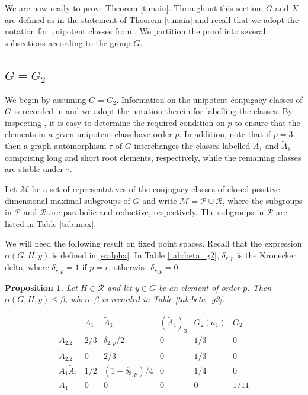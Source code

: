 \documentclass[twoside,a4paper,reqno,11pt]{amsart}
\renewcommand{\a}{\alpha}
\renewcommand{\b}{\beta}
\newcommand{\<}{\langle}
\renewcommand{\>}{\rangle}
\newcommand{\leqs}{\leqslant}
\renewcommand{\:}{\colon}
\theoremstyle{plain}
\newtheorem{prop}[thm]{Proposition}
\theoremstyle{definition}
\begin{document}
We are now ready to prove Theorem \ref{t:main}. Throughout this section, $G$ and $X$ are defined as in the statement of Theorem \ref{t:main} and recall that we adopt the notation for unipotent classes from \cite{LS_book}. We partition the proof into several subsections according to the group $G$.

\subsection{$G = G_2$}\label{ss:g2}

We begin by assuming $G = G_2$. Information on the unipotent conjugacy classes of $G$ is recorded in \cite[Table 22.1.5]{LS_book} and we adopt the notation therein for labelling the classes. By inspecting \cite[Table 1]{Law1}, it is easy to determine the required condition on $p$ to ensure that the elements in a given unipotent class have order $p$. In addition, note that if $p=3$ then a graph automorphism $\tau$ of $G$ interchanges the classes labelled $A_1$ and $\tilde{A}_1$ comprising long and short root elements, respectively, while the remaining classes are stable under $\tau$. 

Let $\mathcal{M}$ be a set of representatives of the conjugacy classes of closed positive dimensional maximal subgroups of $G$ and write $\mathcal{M} = \mathcal{P} \cup \mathcal{R}$, where the subgroups in $\mathcal{P}$ and $\mathcal{R}$ are parabolic and reductive, respectively. The subgroups in $\mathcal{R}$ are listed in Table \ref{tab:max}.

We will need the following result on fixed point spaces. Recall that the expression $\a(G,H,y)$ is defined in \eqref{e:alpha}. In Table \ref{tab:beta_g2}, $\delta_{r,p}$ is the Kronecker delta, where $\delta_{r,p}=1$ if $p=r$, otherwise $\delta_{r,p}=0$.

\begin{prop}\label{p:g2_dim3}
Let $H \in \mathcal{R}$ and let $y \in G$ be an element of order $p$. Then $\a(G,H,y) \leqs \b$, where $\b$ is recorded in Table \ref{tab:beta_g2}.
\end{prop}

{\small
\begin{table}
\[
\begin{array}{l|ccccc}
& A_1 & \tilde{A}_1 & (\tilde{A}_1)_3 & G_2(a_1) & G_2 \\ \hline
A_2.2 & 2/3 & \delta_{2,p}/2 & 0 & 1/3  & 0 \\
\tilde{A}_2.2  & 0 & 2/3 & 0 & 1/3 & 0 \\
A_1\tilde{A}_1 & 1/2 & (1+\delta_{3,p})/4 & 0 & 1/4 & 0 \\
A_1 & 0 & 0 & 0 & 0 & 1/11 \\
\end{array}
\]
\caption{The upper bound $\a(G,H,y) \leqs \b$ in Proposition \ref{p:g2_dim3}}
\label{tab:beta_g2}
\end{table}}
\end{document}
